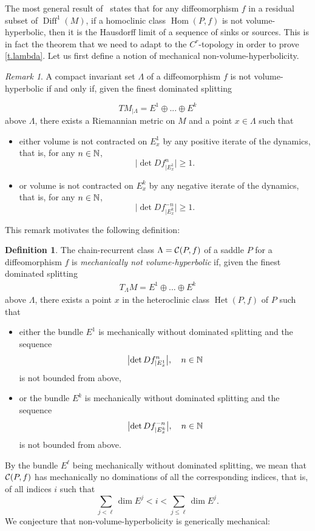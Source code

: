 \documentclass[11pt, a4paper]{amsart}
\theoremstyle{plain}
\theoremstyle{definition}
\newtheorem{definition}{Definition}[proposition]
\theoremstyle{remark}
\newtheorem{remark}[proposition]{Remark}
\numberwithin{equation}{section}         %
\DeclareMathOperator{\Diff}{{Diff}}
\def\Diff{\operatorname{Diff}}
\def\Het{\operatorname{Het}}
\def\Hom{\operatorname{Hom}}
\begin{document}
The most general result of~\cite{BDP} states that for any diffeomorphism $f$ in a residual subset of $\Diff^1(M)$, if a homoclinic class $\Hom(P,f)$ is not volume-hyperbolic, then it is the Hausdorff limit of a sequence of sinks or sources. This is in fact the theorem that we need to adapt to the $C^r$-topology in order to prove \cref{t.lambda}. Let us first define a notion of mechanical non-volume-hyperbolicity.


\begin{remark}
A compact invariant set $\Lambda$ of a diffeomorphism $f$ is not volume-hyperbolic if and only if, given the finest dominated splitting 

$$TM_{|\Lambda}=E^1\oplus ... \oplus E^k$$
above $\Lambda$, there exists a Riemannian metric on $M$ and a point $x\in \Lambda$ such that 
\begin{itemize}
\item either volume is not contracted on $E^1_x$ by any positive iterate of the dynamics, that is,  for any $n\in {\mathbb N}$,  
 $$\bigl|\det Df^n_{|E^1_x}\bigr|\geq 1.$$
 \item or volume is not contracted on $E^k_x$ by any negative iterate of the dynamics, that is,  for any $n\in {\mathbb N}$,  
  $$\bigl|\det Df^{-n}_{|E^k_x}\bigr|\geq 1.$$
\end{itemize}
\end{remark}

This remark motivates the following definition:

\begin{definition}
The chain-recurrent class $\Lambda={\mathcal C}(P,f)$ of a saddle $P$ for a diffeomorphism $f$ is {\em mechanically not volume-hyperbolic} if, given the finest dominated splitting 
\begin{align*}T_\Lambda M=E^1\oplus ... \oplus E^k\end{align*}
 above $\Lambda$, there exists a point $x$ in the heteroclinic class $\Het(P,f)$ of $P$ such that 
\begin{itemize}
\item either the bundle $E^1$ is mechanically without dominated splitting and the sequence  
$$\bigl|\det Df^n_{|E^1_x}\bigr|, \quad n\in {\mathbb N}$$
is not bounded from above,
\item or the bundle $E^k$ is mechanically without dominated splitting and the sequence 
$$\bigl|\det Df^{-n}_{|E^k_x}\bigr|,  \quad n\in {\mathbb N}$$
is not bounded from above.
\end{itemize}
\end{definition}
By the bundle $E^\ell$ being mechanically without dominated splitting, we mean that ${\mathcal C}(P,f)$ has mechanically no dominations of all the corresponding indices, that is, of all indices $i$ such that 
$$\sum_{j<\ell} \dim E^j<i<\sum_{j\leq \ell} \dim E^j.$$
We conjecture that non-volume-hyperbolicity is generically mechanical:
\end{document}

